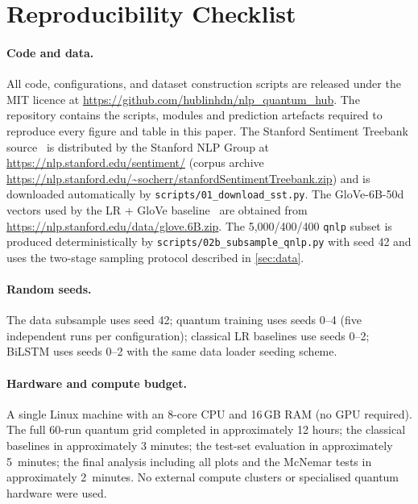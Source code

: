\documentclass[runningheads]{llncs}
\begin{document}



\appendix

\section{Reproducibility Checklist}\label{app:repro}

\paragraph{Code and data.} All code, configurations, and dataset
construction scripts are released under the MIT licence at
\url{https://github.com/hublinhdn/nlp_quantum_hub}. The repository
contains the scripts, modules and prediction artefacts required to
reproduce every figure and table in this paper.
The Stanford Sentiment Treebank source~\cite{socher2013} is
distributed by the Stanford NLP Group at
\url{https://nlp.stanford.edu/sentiment/} (corpus archive
\url{https://nlp.stanford.edu/~socherr/stanfordSentimentTreebank.zip})
and is downloaded automatically by
\texttt{scripts/01\_download\_sst.py}. The GloVe-6B-50d vectors used
by the LR + GloVe baseline~\cite{pennington2014} are obtained from
\url{https://nlp.stanford.edu/data/glove.6B.zip}. The 5{,}000/400/400
\texttt{qnlp} subset is produced deterministically by
\texttt{scripts/02b\_subsample\_qnlp.py} with seed 42 and uses the
two-stage sampling protocol described in \cref{sec:data}.

\paragraph{Random seeds.} The data subsample uses seed 42; quantum
training uses seeds 0--4 (five independent runs per configuration);
classical LR baselines use seeds 0--2; BiLSTM uses seeds 0--2 with the
same data loader seeding scheme.

\paragraph{Hardware and compute budget.} A single Linux machine with an
8-core CPU and 16\,GB RAM (no GPU required). The full 60-run quantum grid
completed in approximately 12 hours; the classical baselines in
approximately 3 minutes; the test-set evaluation in approximately
5~minutes; the final analysis including all plots and the McNemar tests
in approximately 2~minutes. No external compute clusters or specialised
quantum hardware were used.
\end{document}
